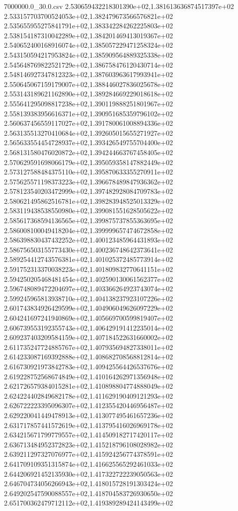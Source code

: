 \begin{filecontents*}{7000000.0_30.0.csv}
2.530659432218301390e+02,1.381613636874517397e+02
2.533157703700524053e+02,1.382479673566576821e+02
2.535655955275841791e+02,1.383342284262225803e+02
2.538154187310042289e+02,1.384201469413019367e+02
2.540652400168916074e+02,1.385057229471258324e+02
2.543150594217953824e+02,1.385909564889325338e+02
2.545648769822521729e+02,1.386758476120430714e+02
2.548146927347812323e+02,1.387603963617993941e+02
2.550645067159179007e+02,1.388446027836025678e+02
2.553143189621162890e+02,1.389284669229018618e+02
2.555641295098817238e+02,1.390119888251801967e+02
2.558139383956616371e+02,1.390951685359796102e+02
2.560637456559117027e+02,1.391780061008894336e+02
2.563135513270410684e+02,1.392605015655271927e+02
2.565633554454728937e+02,1.393426549755704400e+02
2.568131580476020872e+02,1.394244663767458405e+02
2.570629591698066179e+02,1.395059358147882449e+02
2.573127588484375110e+02,1.395870633355270911e+02
2.575625571198373223e+02,1.396678489847936362e+02
2.578123540203472999e+02,1.397482928084709783e+02
2.580621495862516781e+02,1.398283948525013329e+02
2.583119438538550980e+02,1.399081551628505622e+02
2.585617368594136565e+02,1.399875737855363695e+02
2.586008100049418204e+02,1.399999657474672858e+02
2.586398830437432252e+02,1.400123485964431893e+02
2.586756503155773430e+02,1.400236748642373641e+02
2.589254412743576381e+02,1.401025372485773914e+02
2.591752313370038223e+02,1.401809832770641151e+02
2.594250205468481454e+02,1.402590130061562377e+02
2.596748089472204697e+02,1.403366264923743074e+02
2.599245965813938710e+02,1.404138237923107226e+02
2.601743834926429599e+02,1.404906049626097229e+02
2.604241697241940869e+02,1.405669700599819407e+02
2.606739553192355743e+02,1.406429191412235014e+02
2.609237403209584159e+02,1.407184522631660002e+02
2.611735247724885767e+02,1.407935694827338011e+02
2.614233087169392888e+02,1.408682708568812814e+02
2.616730921973842783e+02,1.409425564426537676e+02
2.619228752568674849e+02,1.410164262971356948e+02
2.621726579384015281e+02,1.410898804774888049e+02
2.624224402849682178e+02,1.411629190409121293e+02
2.626722223395096307e+02,1.412355420446956487e+02
2.629220041449478913e+02,1.413077495461657236e+02
2.631717857441572619e+02,1.413795416026969178e+02
2.634215671799779557e+02,1.414509182717420117e+02
2.636713484952372823e+02,1.415218796108028982e+02
2.639211297327076977e+02,1.415924256774378591e+02
2.641709109351315874e+02,1.416625565292461033e+02
2.644206921452135930e+02,1.417322722239050563e+02
2.646704734056266943e+02,1.418015728191303424e+02
2.649202547590088557e+02,1.418704583726930650e+02
2.651700362479712112e+02,1.419389289424143499e+02

\end{filecontents*}
